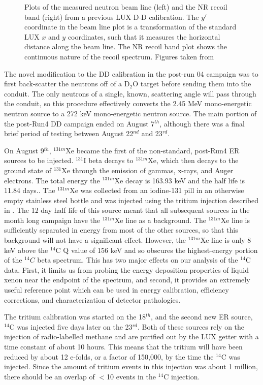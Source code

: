 {\begin{figure}[h!]
\begin{subfigure}{0.5\textwidth}
\end{subfigure}
\caption{Plots of the measured neutron beam line (left) and the NR recoil band (right) from a previous LUX D-D calibration. The $y'$ coordinate in the beam line plot is a transformation of the standard LUX $x$ and $y$ coordinates, such that it measures the horizontal distance along the beam line. The NR recoil band plot shows the continuous nature of the recoil spectrum. Figures taken from \cite{lux_dd2} }
\label{fig:ddplot}
\end{figure}

The novel modification to the DD calibration in the post-run 04 campaign was to first back-scatter the neutrons off of a D$_2$O target before sending them into the conduit. The only neutrons of a single, known, scattering angle will pass through the conduit, so this procedure effectively converts the 2.45 MeV mono-energetic neutron source to a 272 keV mono-energetic neutron source. The main portion of the post-Run4 DD campaign ended on August 7$^{th}$, although there was a final brief period of testing between August 22$^{nd}$ and 23$^{rd}$\cite{lux_dd1}.


On August 9$^{th}$, $^{131m}$Xe became the first of the non-standard, post-Run4 ER sources to be injected. $^{131}$I beta decays to $^{131m}$Xe, which then decays to the ground state of $^{131}$Xe through the emission of gammas, x-rays, and Auger electrons. The total energy the $^{131m}$Xe decay is 163.93 keV and the half life is 11.84 days.\cite{nuclide}. The $^{131m}$Xe was collected from an iodine-131 pill in an otherwise empty stainless steel bottle and was injected using the tritium injection described in \cite{lux_tritium}. The 12 day half life of this source meant that all subsequent sources in the month long campaign have the $^{131m}$Xe line as a background. The $^{131m}$Xe line is sufficiently separated in energy from most of the other sources, so that this background will not have a significant effect. However, the $^{131m}$Xe line is only 8 keV above the $^{14}$C Q value of 156 keV and so obscures the highest-energy portion of the $^{14}C$ beta spectrum. This has two major effects on our analysis of the $^{14}$C data. First, it limits us from probing the energy deposition properties of liquid xenon near the endpoint of the spectrum, and second, it provides an extremely useful reference point which can be used in energy calibration, efficiency corrections, and characterization of detector pathologies.

The tritium calibration was started on the 18$^{th}$, and the second new ER source, $^{14}$C was injected five days later on the 23$^{rd}$. Both of these sources rely on the injection of radio-labelled methane and are purified out by the LUX getter with a time constant of about 10 hours. This means that the tritium will have been reduced by about 12 e-folds, or a factor of 150,000, by the time the $^{14}$C was injected. Since the amount of tritium events in this injection was about 1 million, there should be an overlap of $<$10 events in the $^{14}$C injection.

}
